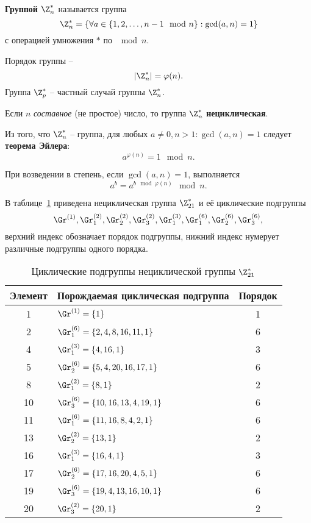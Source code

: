 \textbf{Группой $\Z_n^*$} называется группа
    \[ \Z_n^* = \left\{ \forall a \in \left\{ 1, 2, \dots, n-1 \mod n \right\} : \gcd(a,n) = 1 \right\} \]
с операцией умножения $\ast$ по $\mod n$.

Порядок группы --
    \[ |\Z_n^*| = \varphi(n). \]
Группа $\Z_p^*$ -- частный случай группы $\Z_n^*$.

Если $n$ \emph{составное} (не простое) число, то группа $\Z_n^*$ \textbf{нециклическая}.

Из того, что $\Z_n^*$ -- группа, для любых $a \neq 0, n > 1: \gcd(a,n) = 1$ следует \textbf{теорема Эйлера}:
    \[ a^{\varphi(n)} = 1 \mod n. \]

При возведении в степень, если $\gcd(a,n) = 1$, выполняется
    \[ a^b = a^{b \mod \varphi(n)} \mod n. \]

\example
В таблице~\ref{tab:Zn-sample} приведена нециклическая группа $\Z_{21}^*$ и её циклические подгруппы
    \[ \Gr^{(1)}, \Gr_1^{(2)}, \Gr_2^{(2)}, \Gr_3^{(2)}, \Gr_1^{(3)}, \Gr_1^{(6)}, \Gr_2^{(6)}, \Gr_3^{(6)}, \]
верхний индекс обозначает порядок подгруппы, нижний индекс нумерует различные подгруппы одного порядка.

\begin{table}[!ht]
    \centering
    \caption{Циклические подгруппы нециклической группы $\Z_{21}^*$\label{tab:Zn-sample}}
    \begin{tabular}{|c|l|c|}
        \hline
        Элемент & Порождаемая циклическая подгруппа & Порядок \\
        \hline
        1  & $\Gr^{(1)} = \{ 1 \}$ & 1 \\
        2  & $\Gr_1^{(6)} = \{ 2, 4, 8, 16, 11, 1 \}$ & 6 \\
        4  & $\Gr_1^{(3)} = \{ 4, 16, 1 \}$ & 3 \\
        5  & $\Gr_2^{(6)} = \{ 5, 4, 20, 16, 17, 1 \}$ & 6 \\
        8  & $\Gr_1^{(2)} = \{ 8, 1 \}$ & 2 \\
        10 & $\Gr_3^{(6)} = \{ 10, 16, 13, 4, 19, 1 \}$ & 6 \\
        11 & $\Gr_1^{(6)} = \{ 11, 16, 8, 4, 2, 1 \}$ & 6 \\
        13 & $\Gr_2^{(2)} = \{ 13, 1 \}$ & 2 \\
        16 & $\Gr_1^{(3)} = \{ 16, 4, 1 \}$ & 3 \\
        17 & $\Gr_2^{(6)} = \{ 17, 16, 20, 4, 5, 1 \}$ & 6 \\
        19 & $\Gr_3^{(6)} = \{ 19, 4, 13, 16, 10, 1 \}$ & 6 \\
        20 & $\Gr_3^{(2)} = \{ 20, 1 \}$ & 2 \\
        \hline
    \end{tabular}
\end{table}
\exampleend

